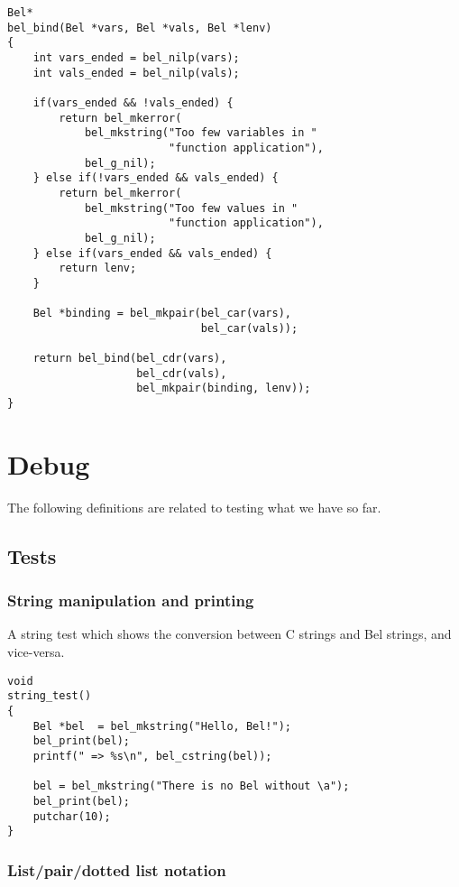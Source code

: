 \documentclass[openright,a4paper,twoside,12pt]{memoir}
\begin{document}
\begin{verbatim}
Bel*
bel_bind(Bel *vars, Bel *vals, Bel *lenv)
{
    int vars_ended = bel_nilp(vars);
    int vals_ended = bel_nilp(vals);

    if(vars_ended && !vals_ended) {
        return bel_mkerror(
            bel_mkstring("Too few variables in "
                         "function application"),
            bel_g_nil);
    } else if(!vars_ended && vals_ended) {
        return bel_mkerror(
            bel_mkstring("Too few values in "
                         "function application"),
            bel_g_nil);
    } else if(vars_ended && vals_ended) {
        return lenv;
    }

    Bel *binding = bel_mkpair(bel_car(vars),
                              bel_car(vals));

    return bel_bind(bel_cdr(vars),
                    bel_cdr(vals),
                    bel_mkpair(binding, lenv));
}
\end{verbatim}

\chapter{Debug}
\label{sec:org26b3c40}

The following definitions are related to testing what we have so
far.

\section{Tests}
\label{sec:org53037b3}
\subsection{String manipulation and printing}
\label{sec:org9d1e158}

A string test which shows the conversion between C strings and Bel
strings, and vice-versa.

\begin{verbatim}
void
string_test()
{
    Bel *bel  = bel_mkstring("Hello, Bel!");
    bel_print(bel);
    printf(" => %s\n", bel_cstring(bel));

    bel = bel_mkstring("There is no Bel without \a");
    bel_print(bel);
    putchar(10);
}
\end{verbatim}

\subsection{List/pair/dotted list notation}
\label{sec:org45c39f6}
\end{document}
